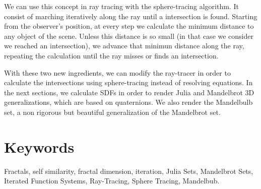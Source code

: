 We can use this concept in ray tracing with the sphere-tracing algorithm. It consist of marching iteratively along the ray until a intersection is found. Starting from the observer's position, at every step we calculate the minimum distance to any object of the scene. Unless this distance is so small (in that case we consider we reached an intersection), we advance that minimun distance along the ray, repeating the calculation until the ray misses or finds an intersection.

With these two new ingredients, we can modify the ray-tracer in order to calculate the intersections using sphere-tracing instead of resolving equations. In the next sections, we calculate SDFs in order to render Julia and Mandelbrot 3D generalizations, which are based on quaternions. We also render the Mandelbulb set, a non rigorous but beautiful generalization of the Mandelbrot set.

\section*{Keywords}

Fractals, self similarity, fractal dimension, iteration, Julia Sets, Mandelbrot Sets, Iterated Function Systems, Ray-Tracing, Sphere Tracing, Mandelbub. 